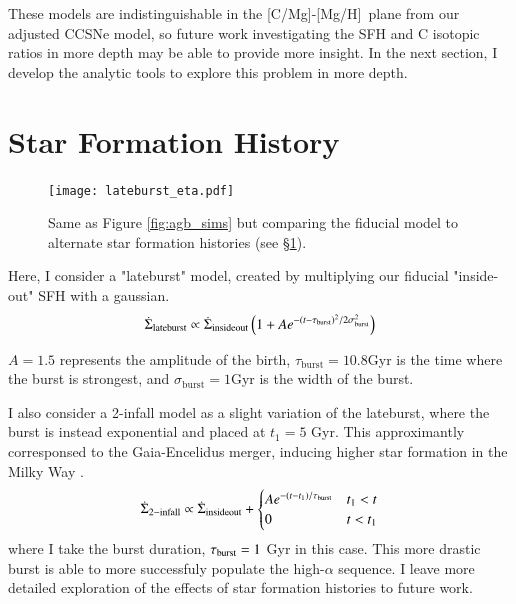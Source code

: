 \documentclass[12pt,oneside]{report}
\newcommand{\caah}{[C/Mg]-[Mg/H]}
\begin{document}
These models are indistinguishable in the \caah~plane from our adjusted CCSNe model, so future work investigating the SFH and C isotopic ratios in more depth may be able to provide more insight. In the next section, I develop the analytic tools to explore this problem in more depth. 

\section{Star Formation History} \label{sec:sfh}



\begin{figure}
\centering
\texttt{[image: lateburst\_eta.pdf]}

\caption[Lateburst models]{Same as Figure \ref{fig:agb_sims} but comparing the fiducial model to alternate star formation histories (see \S \ref{sec:sfh}).}
\label{fig:sfh_models}

\end{figure}


Here, I consider a "lateburst" model, created by multiplying our fiducial "inside-out" SFH with a gaussian.
\begin{equation}\label{eq:lateburst}
    \dot{\Sigma}_{\rm lateburst} \propto \dot{\Sigma}_{\rm insideout} \left(1 + A e^{-(t-\tau_{\rm burst})^2/2\sigma^2_{\rm burst}} \right)
\end{equation}

$A=1.5$ represents the amplitude of the birth, $\tau_\text{burst}=10.8$Gyr is the time where the burst is strongest, and $\sigma_\text{burst}=1$Gyr is the width of the burst.

I also consider a 2-infall model as a slight variation of the lateburst, where the burst is instead exponential and placed at $t_1=5$ Gyr. This approximantly corresponsed to the Gaia-Encelidus merger, inducing higher star formation in the Milky Way \citep{bonaca20, helmi18}.
\begin{equation}\label{eq:twoinfall}
    \dot{\Sigma}_{\rm 2-infall} \propto \dot{\Sigma}_{\rm insideout} + 
\begin{cases}
    Ae^{-(t-t_1)/\tau_{\rm burst}} & t_1 < t \\
      0 & t<t_1
\end{cases}
\end{equation}
where I take the burst duration, $\tau_{\rm burst}=1$ Gyr in this case. 
This more drastic burst is able to more successfuly populate the high-$\alpha$ sequence. I leave more detailed exploration of the effects of star formation histories to future work.
\end{document}
